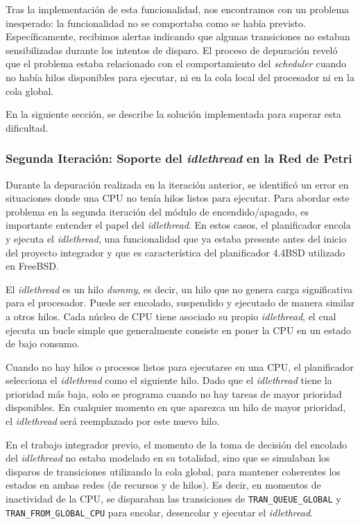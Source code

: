 Tras la implementación de esta funcionalidad, nos encontramos con un problema inesperado: la funcionalidad no se comportaba como se había previsto. Específicamente, recibimos alertas indicando que algunas transiciones no estaban sensibilizadas durante los intentos de disparo. El proceso de depuración reveló que el problema estaba relacionado con el comportamiento del \textit{scheduler} cuando no había hilos disponibles para ejecutar, ni en la cola local del procesador ni en la cola global.

En la siguiente sección, se describe la solución implementada para superar esta dificultad.

\subsubsection{Segunda Iteración: Soporte del \textit{idlethread} en la Red de Petri}
\label{ch:idlethread}

Durante la depuración realizada en la iteración anterior, se identificó un error en situaciones donde una CPU no tenía hilos listos para ejecutar. Para abordar este problema en la segunda iteración del módulo de encendido/apagado, es importante entender el papel del \textit{idlethread}. En estos casos, el planificador encola y ejecuta el \textit{idlethread}, una funcionalidad que ya estaba presente antes del inicio del proyecto integrador y que es característica del planificador 4.4BSD utilizado en FreeBSD.\par

El \textit{idlethread} es un hilo \textit{dummy}, es decir, un hilo que no genera carga significativa para el procesador. Puede ser encolado, suspendido y ejecutado de manera similar a otros hilos. Cada núcleo de CPU tiene asociado su propio \textit{idlethread}, el cual ejecuta un bucle simple que generalmente consiste en poner la CPU en un estado de bajo consumo.

Cuando no hay hilos o procesos listos para ejecutarse en una CPU, el planificador selecciona el \textit{idlethread} como el siguiente hilo. Dado que el \textit{idlethread} tiene la prioridad más baja, solo se programa cuando no hay tareas de mayor prioridad disponibles. En cualquier momento en que aparezca un hilo de mayor prioridad, el \textit{idlethread} será reemplazado por este nuevo hilo.

En el trabajo integrador previo, el momento de la toma de decisión del encolado del \textit{idlethread} no estaba modelado en su totalidad, sino que se simulaban los disparos de transiciones utilizando la cola global, para mantener coherentes los estados en ambas redes (de recursos y de hilos). Es decir, en momentos de inactividad de la CPU, se disparaban las transiciones de \texttt{TRAN\_QUEUE\_GLOBAL} y \texttt{TRAN\_FROM\_GLOBAL\_CPU} para encolar, desencolar y ejecutar el \textit{idlethread}.

